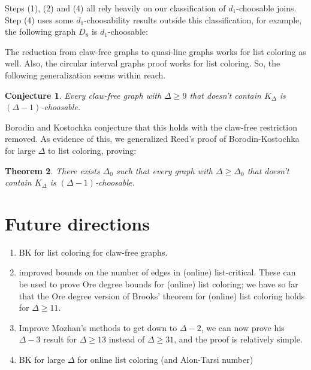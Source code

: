 \documentclass[12pt]{article}
\theoremstyle{plain}
\newtheorem{thm}{Theorem}[section]
\newtheorem{conjecture}[thm]{Conjecture}
\theoremstyle{definition}
\theoremstyle{remark}
\begin{document}
Steps (1), (2) and (4) all rely heavily on our classification of $d_1$-choosable joins.  Step (4) uses some $d_1$-choosability results outside this classification, for example, the following graph $D_8$ is $d_1$-choosable:



The reduction from claw-free graphs to quasi-line graphs works for list coloring as well.  Also, the circular interval graphs proof works for list coloring.  So, the following generalization seems within reach.

\begin{conjecture}
Every claw-free graph with $\Delta \geq 9$ that doesn't contain $K_{\Delta}$ is $(\Delta-1)$-choosable.
\end{conjecture}

Borodin and Kostochka conjecture that this holds with the claw-free restriction removed.  As evidence of this, we generalized Reed's proof of Borodin-Kostochka for large $\Delta$ to list coloring, proving:

\begin{thm}
There exists $\Delta_0$ such that every graph with $\Delta \geq \Delta_0$ that doesn't contain $K_{\Delta}$ is $(\Delta-1)$-choosable.
\end{thm}

\section{Future directions}
\begin{enumerate}
\item BK for list coloring for claw-free graphs.
\item improved bounds on the number of edges in (online) list-critical.  These can be used to prove Ore degree bounds for (online) list coloring; we have so far that the Ore degree version of Brooks' theorem for (online) list coloring holds for $\Delta \geq 11$.
\item Improve Mozhan's methods to get down to $\Delta-2$, we can now prove his $\Delta-3$ result for $\Delta \geq 13$ instead of $\Delta \geq 31$, and the proof is relatively simple.
\item BK for large $\Delta$ for online list coloring (and Alon-Tarsi number)
\end{enumerate}
\end{document}
